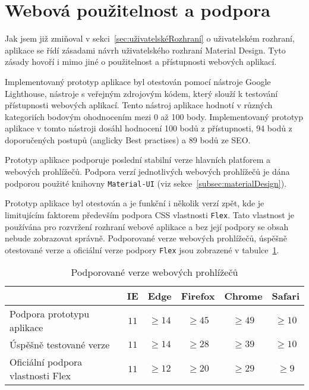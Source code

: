 
\section{Webová použitelnost a podpora}\label{sec:webováPoužitelnostAPodpora}

Jak jsem již zmiňoval v sekci~\ref{sec:uživatelskéRozhraní} o uživatelském rozhraní, aplikace se řídí zásadami návrh uživatelského rozhraní Material Design.
Tyto zásady hovoří i mimo jiné o použitelnost a přístupnosti webových aplikací.

Implementovaný prototyp aplikace byl otestován pomocí nástroje Google Lighthouse, nástroje s veřejným zdrojovým kódem, který slouží k testování přístupnosti webových aplikací.
Tento nástroj aplikace hodnotí v různých kategoriích bodovým ohodnocením mezi 0 až 100 body.
Implementovaný prototyp aplikace v tomto nástroji dosáhl hodnocení 100 bodů z přístupnosti, 94 bodů z doporučených postupů (anglicky Best practises) a 89 bodů ze \gls{SEO}.

Prototyp aplikace podporuje poslední stabilní verze hlavních platforem a webových prohlížečů.
Podpora verzí jednotlivých webových prohlížečů je dána podporou použité knihovny \texttt{Material-UI} (viz sekce~\ref{subsec:materialDesign}).

Prototyp aplikace byl otestován a je funkční i několik verzí zpět, kde je limitujícím faktorem především podpora \acrshort{CSS} vlastnosti \texttt{Flex}.
Tato vlastnost je používána pro rozvržení rozhraní webové aplikace a bez její podpory se obsah nebude zobrazovat správně.
Podporované verze webových prohlížečů, úspěšně otestované verze a oficiální verze podpory \texttt{Flex} jsou zobrazené v tabulce~\ref{tab:verzeProhlížečů}.

\begin{table}[ht!]
    \centering
    \caption{Podporované verze webových prohlížečů}
    \label{tab:verzeProhlížečů}
    \begin{tabular}{l|ccccc}
        & IE & Edge & Firefox & Chrome & Safari \\ \hline
        Podpora prototypu aplikace & $11$ & $\geq 14$ & $\geq 45$ & $\geq 49$ & $\geq 10$ \\
        Úspěšně testované verze & $11$ & $\geq 14$ & $\geq 28$ & $\geq 39$ & $\geq 10$ \\
        Oficiální podpora vlastnosti Flex & $11$ & $\geq 12$ & $\geq 20$ & $\geq 29$ & $\geq 9$
    \end{tabular}
\end{table}

